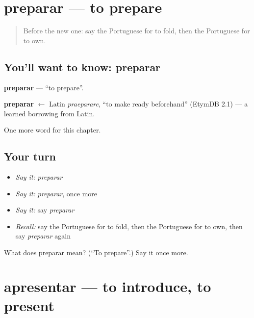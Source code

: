 \section[preparar]{preparar — to prepare}

\label{lesson:PT-C235-preparar}



\begin{quote}
Before the new one: say the Portuguese for to fold, then the Portuguese for to own.
\end{quote}

\subsection*{You'll want to know: preparar}
\textbf{preparar} — \textquotedblleft{}to prepare\textquotedblright{}.

\begin{cousinweb}
\textbf{preparar} $\leftarrow$ Latin \emph{praeparare}, \textquotedblleft{}to make ready beforehand\textquotedblright{} (EtymDB 2.1) — a learned borrowing from Latin.
\end{cousinweb}

\begin{grammarlens}[title={What you've built}]
One more word for this chapter.
\end{grammarlens}

\subsection*{Your turn}
\begin{itemize}
\raggedright
  \item \emph{Say it:} \emph{preparar}
  \item \emph{Say it:} \emph{preparar}, once more
  \item \emph{Say it:} say \emph{preparar}
  \item \emph{Recall:} say the Portuguese for to fold, then the Portuguese for to own, then say \emph{preparar} again
\end{itemize}

\begin{tcolorbox}[breakable,colback=teal!4,colframe=teal!35!black,title={Before you move on}]
What does preparar mean? (\textquotedblleft{}To prepare\textquotedblright{}.) Say it once more.
\end{tcolorbox}
\section[apresentar]{apresentar — to introduce, to present}


